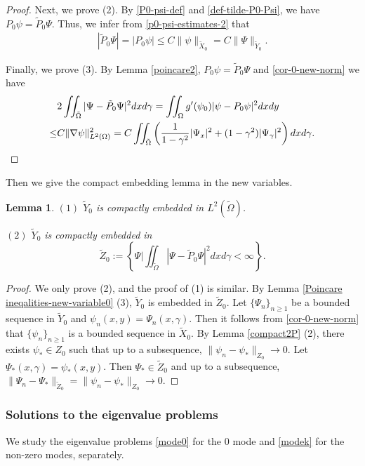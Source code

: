 \documentclass[1 [leqno, 11pt]{amsart}
\numberwithin{equation}{section}
\newtheorem{lemma}[Theorem]{Lemma}
\begin{document}
\begin{CJK*}{GBK}{song}
\begin{proof}
Next, we prove (2). By \eqref{P0-psi-def} and \eqref{def-tilde-P0-Psi}, we have $P_0\psi=\tilde P_0\Psi$.  Thus, we infer from
\eqref{p0-psi-estimates-2} that
\begin{align*}
|\tilde P_0\Psi|=|P_0\psi|\leq C \| \psi\|_{\tilde X_0}=C \|\Psi\|_{\tilde Y_0}.
\end{align*}

Finally, we prove (3).
By Lemma \ref{poincare2}, $P_0\psi=\tilde P_0\Psi$ and \eqref{cor-0-new-norm} we have
\begin{align*}
&2\iint_{\tilde \Omega} |\Psi -\tilde P_0\Psi|^2 dxd\gamma =\iint_\Omega g'(\psi_0)|\psi - P_0\psi|^2 dxdy  \\
\leq & C \|\nabla \psi\|_{L^2(\Omega)}^2=C \iint_{\tilde \Omega}\left({1\over1-\gamma^2}|\Psi_{x}|^2+(1-\gamma^2)|\Psi_{\gamma}|^2\right)d x d\gamma.
\end{align*}
\end{proof}

Then we give the  compact embedding lemma in the new variables.
\begin{lemma}\label{compact2P-new-variable0}
$(1)$ $\tilde Y_0$ is compactly embedded in $L^2(\tilde \Omega)$.

$(2)$  $\tilde Y_0$ is compactly embedded in
 \begin{equation*}
 \tilde Z_{0}:=\left\{\Psi\bigg|\iint_{\tilde \Omega}|\Psi-\tilde P_0\Psi|^2dxd\gamma<\infty\right\}.
  \end{equation*}
\end{lemma}
\begin{proof} We only prove (2), and the proof of (1) is similar.
By Lemma \ref{Poincare ineqalities-new-variable0} (3), $\tilde Y_0$ is embedded in $\tilde Z_{0}$. Let $\{\Psi_n\}_{n\geq1}$ be a bounded sequence in $\tilde{Y}_0$ and $\psi_n(x,y)=\Psi_n(x,\gamma)$. Then it follows from \eqref{cor-0-new-norm} that  $\{\psi_n\}_{n\geq1}$ is a bounded sequence in $\tilde{X}_0$. By Lemma \ref{compact2P} (2), there exists $\psi_*\in Z_0$ such that up to a subsequence, $\|\psi_n-\psi_*\|_{Z_0}\to0$. Let $\Psi_*(x,\gamma)=\psi_*(x,y)$. Then $\Psi_*\in \tilde Z_0$ and up to a subsequence,  $\|\Psi_n-\Psi_*\|_{\tilde Z_0}=\|\psi_n-\psi_*\|_{Z_0}\to0$.
\end{proof}
\subsubsection{Solutions to the eigenvalue problems}\label{Solutions to the eigenvalue problem ep=0}
 We  study the eigenvalue problems \eqref{mode0} for the $0$ mode and \eqref{modek} for the non-zero modes, separately.\medskip



\end{CJK*}
\end{document}

